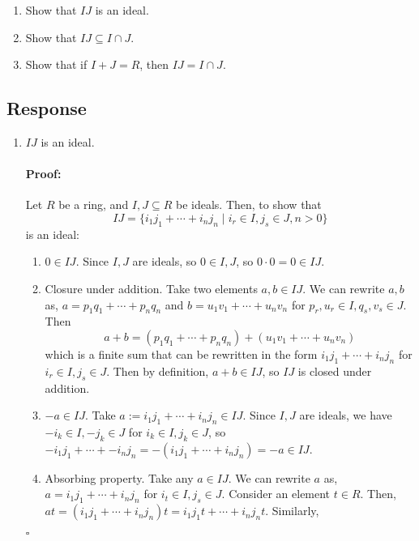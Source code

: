 \documentclass [12pt] {article}
\newenvironment{proof}{\paragraph{Proof:}}{\hfill$\square$}
\begin{document}
\begin{enumerate}
    \item Show that $IJ$ is an ideal. 
    \item Show that $IJ\subseteq I\cap J$. 
    \item Show that if $I+J=R$, then $IJ=I\cap J$.
\end{enumerate}
\subsection*{Response}
\begin{enumerate}
    \item $IJ$ is an ideal. 
        \vspace{-1em}
        \begin{proof}
            Let $R$ be a ring, and $I, J \subseteq R$ be ideals. Then, to show that 
            \[IJ = \{ i_1 j_1 + \cdots + i_n j_n \mid i_r \in I, j_s \in J, n>0 \}\] 
            is an ideal:
            \begin{enumerate}
                \item $0 \in IJ$. Since $I, J$ are ideals, so $0 \in I, J$, so $0 \cdot 0 = 0 \in IJ$.
                \item Closure under addition. Take two elements $a, b \in IJ$. We can rewrite $a, b$ 
                    as,
                    $a = p_1 q_1 + \cdots + p_n q_n$ and $b = u_1 v_1 + \cdots + u_n v_n$ for $p_r,
                    u_r \in I, q_s, v_s \in J$. Then
                    \[
                        a + b = (p_1 q_1 + \cdots + p_n q_n) + (u_1 v_1 + \cdots + u_n v_n)
                    \]
                    which is a finite sum that can be rewritten in the form 
                    $i_1 j_1 + \cdots + i_n j_n$ for $i_r \in I, j_s \in J$. Then by definition, 
                    $a + b \in IJ$, so $IJ$ is closed under addition.
                \item $-a \in IJ$. Take $a := i_1 j_1 + \cdots + i_n j_n \in IJ$. Since $I, J$ are
                    ideals, we have $-i_k \in I, -j_k \in J$ for $i_k \in I, j_k \in J$, so 
                    $-i_1 j_1 + \cdots + -i_n j_n = -(i_1 j_1 + \cdots + i_n j_n) = -a \in IJ$.
                \item Absorbing property. Take any $a \in IJ$. We can
                    rewrite $a$ as, $a = i_1 j_1 + \cdots + i_n j_n$ for $i_t \in I, j_s \in J$. 
                    Consider an element $t \in R$. Then, 
                    $at = (i_1 j_1 + \cdots + i_n j_n) t = i_1 j_1 t + \cdots + i_n j_n t$. Similarly,

\end{enumerate}
\end{proof}
\end{enumerate}
\end{document}
